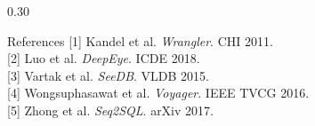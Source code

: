 \documentclass[final]{beamer}
\begin{document}
\begin{frame}[t]{}
\begin{columns}[T,totalwidth=\linewidth]
\begin{column}{0.30\linewidth}
  \vspace{0.6em}

  \begin{block}{References}
    \small
    [1] Kandel et al. \textit{Wrangler}. CHI 2011.\\[0.2em]
    [2] Luo et al. \textit{DeepEye}. ICDE 2018.\\[0.2em]
    [3] Vartak et al. \textit{SeeDB}. VLDB 2015.\\[0.2em]
    [4] Wongsuphasawat et al. \textit{Voyager}. IEEE TVCG 2016.\\[0.2em]
    [5] Zhong et al. \textit{Seq2SQL}. arXiv 2017.
  \end{block}

\end{column}

\end{columns}

\end{frame}
\end{document}
